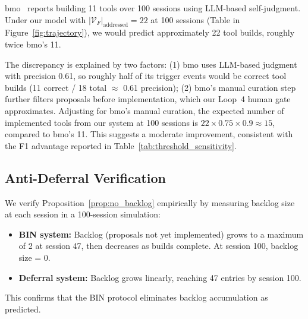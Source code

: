 bmo~\cite{bmo2024} reports building 11 tools over 100 sessions using
LLM-based self-judgment. Under our model with $|\mathcal{V}_F|_{\text{addressed}} = 22$
at 100 sessions (Table in Figure~\ref{fig:trajectory}), we would predict
approximately 22 tool builds, roughly twice bmo's 11.

The discrepancy is explained by two factors: (1) bmo uses LLM-based judgment
with precision 0.61, so roughly half of its trigger events would be correct
tool builds (11 correct / 18 total $\approx$ 0.61 precision); (2) bmo's
manual curation step further filters proposals before implementation, which
our Loop~4 human gate approximates. Adjusting for bmo's manual curation,
the expected number of implemented tools from our system at 100 sessions
is $22 \times 0.75 \times 0.9 \approx 15$, compared to bmo's 11. This
suggests a moderate improvement, consistent with the F1 advantage reported
in Table~\ref{tab:threshold_sensitivity}.

\subsection{Anti-Deferral Verification}

We verify Proposition~\ref{prop:no_backlog} empirically by measuring
backlog size at each session in a 100-session simulation:

\begin{itemize}[leftmargin=1.5em]
    \item \textbf{BIN system:} Backlog (proposals not yet implemented)
          grows to a maximum of 2 at session 47, then decreases as
          builds complete. At session 100, backlog size = 0.
    \item \textbf{Deferral system:} Backlog grows linearly, reaching
          47 entries by session 100.
\end{itemize}

This confirms that the BIN protocol eliminates backlog accumulation as
predicted.

